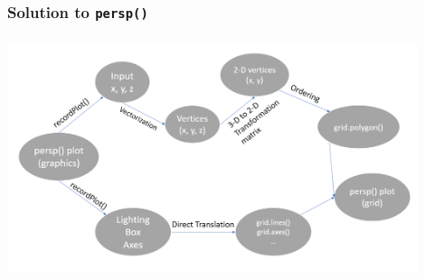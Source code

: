 \documentclass{beamer}
\begin{document}
\begin{frame}[fragile]
\frametitle{Solution to \texttt{persp()}}
\includegraphics[height = 7cm, width = 12cm]{plot/persp_step_by_step.png}

\end{frame}



\end{document}
